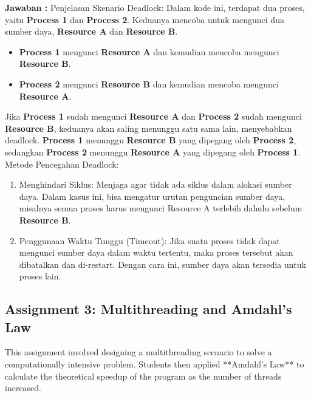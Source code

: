 \documentclass[12pt]{article}
\begin{document}
\textbf{Jawaban : }
Penjelasan Skenario Deadlock:
Dalam kode ini, terdapat dua proses, yaitu \textbf{Process 1} dan \textbf{Process 2}. Keduanya mencoba untuk mengunci dua sumber daya, \textbf{Resource A} dan \textbf{\textbf{Resource B}}.
\begin{itemize}
    \item \textbf{Process 1} mengunci \textbf{Resource A} dan kemudian mencoba mengunci \textbf{Resource B}.
    \item \textbf{Process 2} mengunci \textbf{Resource B} dan kemudian mencoba mengunci \textbf{Resource A}.
\end{itemize}
Jika \textbf{Process 1} sudah mengunci \textbf{Resource A} dan \textbf{Process 2} sudah mengunci \textbf{Resource B}, keduanya akan saling menunggu satu sama lain, menyebabkan deadlock. \textbf{Process 1} menunggu \textbf{Resource B} yang dipegang oleh \textbf{Process 2}, sedangkan \textbf{Process 2} menunggu \textbf{Resource A} yang dipegang oleh \textbf{Process 1}.
Metode Pencegahan Deadlock:
\begin{enumerate}
    \item Menghindari Siklus: Menjaga agar tidak ada siklus dalam alokasi sumber daya. Dalam kasus ini, bisa mengatur urutan penguncian sumber daya, misalnya semua proses harus mengunci Resource A terlebih dahulu sebelum \textbf{Resource B}.
    \item Penggunaan Waktu Tunggu (Timeout): Jika suatu proses tidak dapat mengunci sumber daya dalam waktu tertentu, maka proses tersebut akan dibatalkan dan di-restart. Dengan cara ini, sumber daya akan tersedia untuk proses lain.
\end{enumerate}

\subsection{Assignment 3: Multithreading and Amdahl's Law}
This assignment involved designing a multithreading scenario to solve a computationally intensive problem. Students then applied **Amdahl's Law** to calculate the theoretical speedup of the program as the number of threads increased.
\end{document}
